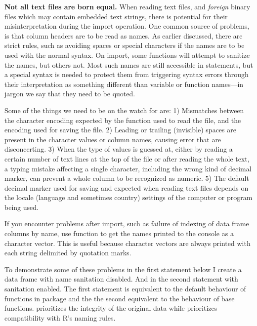 \documentclass[krantz2]{krantz}\usepackage{knitr}%
\begin{document}
\begin{explainbox}
\textbf{Not all text files are born equal.} When reading text files, and \emph{foreign} binary files which may contain embedded text strings, there is potential for their misinterpretation during the import operation. One common source of problems, is that column headers are to be read as \Rlang names. As earlier discussed, there are strict rules, such as avoiding spaces or special characters if the names are to be used with the normal syntax. On import, some functions will attempt to sanitize the names, but others not. Most such names are still accessible in \Rlang statements, but a special syntax is needed to protect them from triggering syntax errors through their interpretation as something different than variable or function names---in \Rlang jargon we say that they need to be quoted.

Some of the things we need to be on the watch for are:
1) Mismatches between the character encoding expected by the function used to read the file, and the encoding used for saving the file.
2) Leading or trailing (invisible) spaces are present in the character values or column names, causing error that are disconcerting.
3) When the type of values is guessed at, either by reading a certain number of text lines at the top of the file or after reading the whole text, a typing mistake affecting a single character, including the wrong kind of decimal marker, can prevent a whole column to be recognized as numeric.
5) The default decimal marker used for saving and expected when reading text files depends on the locale (language and sometimes country) settings of the computer or program being used.

If you encounter problems after import, such as failure of indexing of data frame columns by name, use function  to get the names printed to the console as a character vector. This is useful because character vectors are always printed with each string delimited by quotation marks.

To demonstrate some of these problems in the first statement below I create a data frame with name sanitation disabled. And in the second statement with sanitation enabled. The first statement is equivalent to the default behaviour of functions in package  and the the second equivalent to the behaviour of base \Rlang functions.  prioritizes the integrity of the original data while \Rlang prioritizes compatibility with R's naming rules.


\end{explainbox}
\end{document}
